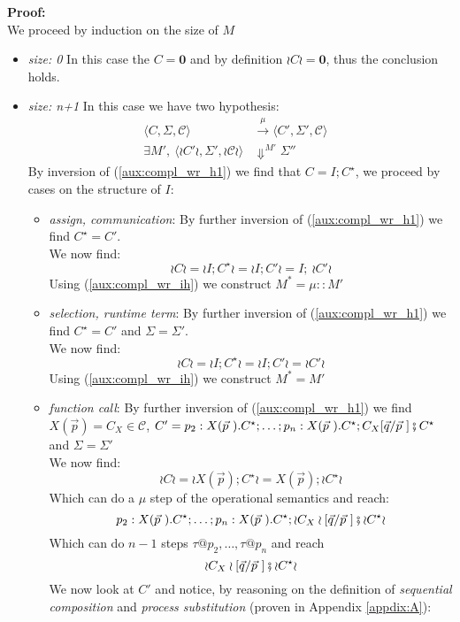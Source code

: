 \documentclass[12pt,a4paper,twoside]{book}
\begin{document}
\noindent \textbf{Proof:}\\
We proceed by induction on the size of $M$
\begin{itemize}
	\item \emph{size: 0} In this case the $C = \boldsymbol{0}$ and by definition
		$\wr C \wr = \boldsymbol{0}$, thus the conclusion holds.
	\item \emph{size: n+1} In this case we have two hypothesis:
		\begin{align}
			\langle C, \Sigma, \mathscr{C} \rangle& \xrightarrow{\mu}
			\langle C', \Sigma', \mathscr{C} \rangle& \tag{H1} \label{aux:compl_wr_h1}\\
			\exists M',~\langle \wr C'\wr, \Sigma', \wr \mathscr{C} \wr \rangle& \Downarrow^{M'} \Sigma'' \tag{IH} \label{aux:compl_wr_ih}
		\end{align}
		By inversion of (\ref{aux:compl_wr_h1}) we find that $C = I; C^\star$, we proceed by cases on the structure of $I$:
		\begin{itemize}
			\item \emph{assign, communication}: By further inversion of (\ref{aux:compl_wr_h1}) we find $C^\star = C'$.\\
			We now find:
			$$\wr C \wr = \wr I; C^\star \wr = \wr I; C' \wr = I;~\wr C' \wr$$
				Using (\ref{aux:compl_wr_ih}) we construct $M^* = \mu :: M'$
			\item \emph{selection, runtime term}:
				By further inversion of (\ref{aux:compl_wr_h1}) we find $C^\star = C'$ and $\Sigma = \Sigma'$.\\
			We now find:
			$$\wr C \wr = \wr I; C^\star \wr = \wr I; C' \wr = \wr C' \wr$$
				Using (\ref{aux:compl_wr_ih}) we construct $M^* = M'$
			\item \emph{function call}: By further inversion of (\ref{aux:compl_wr_h1}) we find $X(\vec{p}) = C_X \in \mathscr{C}$, $C' = p_2 : X(\vec{p}~).C^\star; \ldots; p_n : X(\vec{p}~).C^\star; C_X[\vec{q}/\vec{p}~] \fatsemi C^\star$ and $\Sigma = \Sigma'$\\
			We now find:
				$$\wr C \wr = \wr X(\vec{p}); C^\star \wr = X(\vec{p}); \wr C^\star \wr$$
			Which can do a $\mu$ step of the operational semantics and reach:
				$$p_2 : X(\vec{p}~).C^\star; \ldots; p_n : X(\vec{p}~).C^\star; \wr C_X\wr[\vec{q}/\vec{p}~] \fatsemi \wr C^\star \wr$$
			Which can do $n-1$ steps $\tau@p_2, \ldots, \tau@p_n$ and reach
				$$\wr C_X\wr[\vec{q}/\vec{p}~] \fatsemi \wr C^\star \wr$$
				We now look at $C'$ and notice, by reasoning on the definition of \emph{sequential composition} and \emph{process substitution} (proven in Appendix \ref{appdix:A}):

\end{itemize}
\end{itemize}
\end{document}
